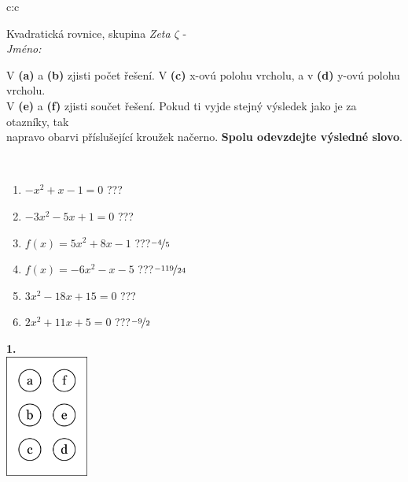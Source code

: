 \documentclass[10pt]{report}
\begin{document}
\begin{tabular}{c:c}
\begin{minipage}[c][104.5mm][t]{0.5\linewidth}
\begin{center}
\vspace{7mm}
{\huge Kvadratická rovnice, skupina \textit{Zeta $\zeta$} -}\\[5mm]
\textit{Jméno:}\phantom{xxxxxxxxxxxxxxxxxxxxxxxxxxxxxxxxxxxxxxxxxxxxxxxxxxxxxxxxxxxxxxxxx}\\[5mm]
\begin{minipage}{0.95\linewidth}
\begin{center}
V \textbf{(a)} a \textbf{(b)} zjisti počet řešení. V \textbf{(c)} x-ovú polohu vrcholu, a v \textbf{(d)} y-ovú polohu vrcholu.\\V \textbf{(e)} a \textbf{(f)} zjisti součet řešení. Pokud ti vyjde stejný výsledek jako je za otazníky, tak\\napravo obarvi příslušející kroužek načerno. \textbf{Spolu odevzdejte výsledné slovo}.
\end{center}
\end{minipage}
\\[1mm]
\begin{minipage}{0.79\linewidth}
\begin{center}
\begin{varwidth}{\linewidth}
\begin{enumerate}
\Large
\item $-x^2+x-1=0$\quad \dotfill\; ???\;\dotfill {}
\item $-3x^2-5x+1=0$\quad \dotfill\; ???\;\dotfill {}
\item $f(x)=5x^2+8x-1$\quad \dotfill\; ???\;\dotfill \quad $\nicefrac{-4}{5}$
\item $f(x)=-6x^2-x-5$\quad \dotfill\; ???\;\dotfill \quad $\nicefrac{-119}{24}$
\item $3x^2-18x+15=0$\quad \dotfill\; ???\;\dotfill {}
\item $2x^2+11x+5=0$\quad \dotfill\; ???\;\dotfill \quad $\nicefrac{-9}{2}$
\end{enumerate}
\end{varwidth}
\end{center}
\end{minipage}
\begin{minipage}{0.20\linewidth}
\begin{center}
{\Huge\bfseries 1.} \\[2mm]
\includegraphics[height=40mm]{../images/braille.png}

\end{center}
\end{minipage}
\end{center}
\end{minipage}
\end{tabular}
\end{document}

